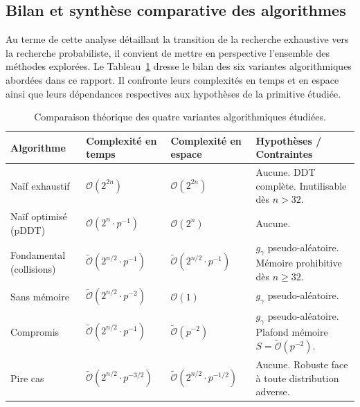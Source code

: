 \documentclass[a4paper,11pt]{article}
\begin{document}
\subsection{Bilan et synthèse comparative des algorithmes}

Au terme de cette analyse détaillant la transition de la recherche exhaustive vers la recherche probabiliste, il convient de mettre en perspective l'ensemble des méthodes explorées. Le Tableau~\ref{tab:synthese_algos} dresse le bilan des six variantes algorithmiques abordées dans ce rapport. Il confronte leurs complexités en temps et en espace ainsi que leurs dépendances respectives aux hypothèses de la primitive étudiée.

\begin{table}[H]
    \centering
    \small
    \caption{Comparaison théorique des quatre variantes algorithmiques étudiées.}
    \label{tab:synthese_algos}
    \renewcommand{\arraystretch}{1.4}
    \begin{tabular}{p{3cm}p{3.5cm}p{3cm}p{5cm}}
        \toprule
        \textbf{Algorithme} & \textbf{Complexité en temps} & \textbf{Complexité en espace} & \textbf{Hypothèses / Contraintes} \\
        \midrule
        Naïf exhaustif 
            & $\mathcal{O}(2^{2n})$ 
            & $\mathcal{O}(2^{2n})$ 
            & Aucune. DDT complète. Inutilisable dès $n > 32$. \\
        Naïf optimisé (pDDT)
            & $\mathcal{O}(2^{n} \cdot p^{-1})$ 
            & $\mathcal{O}(2^{n})$ 
            & Aucune. \\
        Fondamental (collisions)
            & $\tilde{\mathcal{O}}(2^{n/2} \cdot p^{-1})$ 
            & $\tilde{\mathcal{O}}(2^{n/2} \cdot p^{-1})$ 
            & $g_\gamma$ pseudo-aléatoire. Mémoire prohibitive dès $n \ge 32$. \\
        Sans mémoire
            & $\tilde{\mathcal{O}}(2^{n/2} \cdot p^{-2})$ 
            & $\mathcal{O}(1)$ 
            & $g_\gamma$ pseudo-aléatoire. \\
        Compromis
            & $\tilde{\mathcal{O}}(2^{n/2} \cdot p^{-1})$ 
            & $\tilde{\mathcal{O}}(p^{-2})$ 
            & $g_\gamma$ pseudo-aléatoire. Plafond mémoire $S = \tilde{\mathcal{O}}(p^{-2})$. \\
        Pire cas
            & $\tilde{\mathcal{O}}(2^{n/2} \cdot p^{-3/2})$ 
            & $\tilde{\mathcal{O}}(2^{n/2} \cdot p^{-1/2})$ 
            & Aucune. Robuste face à toute distribution adverse. \\
        \bottomrule
    \end{tabular}
\end{table}
\end{document}
